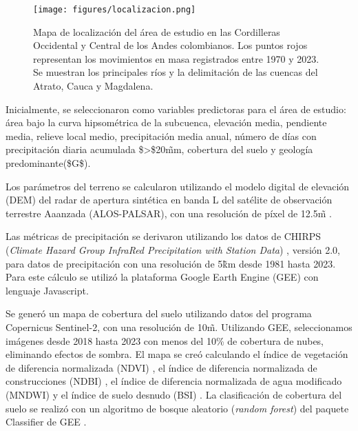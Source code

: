 \documentclass[
  manuscript=article,  
  layout=preprint,  
]{format}
\begin{document}
\begin{figure}[ht!]
    \centering
      {\texttt{[image: figures/localizacion.png]}}
\caption{Mapa de localización del área de estudio en las Cordilleras Occidental y Central de los Andes colombianos. Los puntos rojos representan los movimientos en masa registrados entre 1970 y 2023. Se muestran los principales ríos y la delimitación de las cuencas del Atrato, Cauca y Magdalena.}
    \label{fig:localizacion}
\end{figure}

\par Inicialmente, se seleccionaron como variables predictoras para el área de estudio: área bajo la curva hipsométrica de la subcuenca, elevación media, pendiente media, relieve local medio, precipitación media anual, número de días con precipitación diaria acumulada \$>\$20\~mm, cobertura del suelo y geología predominante(\$G\$).

\par Los parámetros del terreno se calcularon utilizando el modelo digital de elevación (DEM) del radar de apertura sintética en banda L del satélite de observación terrestre Aaanzada (ALOS-PALSAR), con una resolución de píxel de 12.5\~m \cite{logan2014}.

\par Las métricas de precipitación se derivaron utilizando los datos de CHIRPS (\textit{Climate Hazard Group InfraRed Precipitation with Station Data}) \cite{funk2015}, versión 2.0, para datos de precipitación con una resolución de 5\~km desde 1981 hasta 2023. Para este cálculo se utilizó la plataforma Google Earth Engine (GEE) con lenguaje Javascript.

\par Se generó un mapa de cobertura del suelo utilizando datos del programa Copernicus Sentinel-2, con una resolución de 10\~m. Utilizando GEE, seleccionamos imágenes desde 2018 hasta 2023 con menos del 10\% de cobertura de nubes, eliminando efectos de sombra. El mapa se creó calculando el índice de vegetación de diferencia normalizada (NDVI) \cite{kriegler1969}, el índice de diferencia normalizada de construcciones (NDBI) \cite{zha2003}, el índice de diferencia normalizada de agua modificado (MNDWI) \cite{xu2006} y el índice de suelo desnudo (BSI) \cite{li2014}. La clasificación de cobertura del suelo se realizó con un algoritmo de bosque aleatorio (\textit{random forest}) del paquete Classifier de GEE \cite{breiman2001}.
\end{document}
